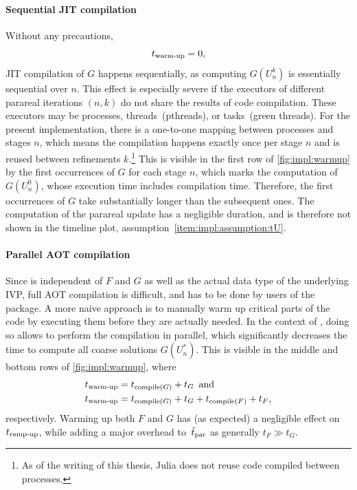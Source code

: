 \paragraph{Sequential \ac{JIT} compilation}

Without any precautions,
\begin{equation*}
  t_\text{warm-up} = 0,
\end{equation*}
\ac{JIT} compilation of $G$ happens sequentially,
as computing $G(U_n^k)$ is essentially sequential over $n$.
This effect is especially severe if the executors of different parareal iterations $(n,k)$ do not share the results of code compilation.
These executors may be processes, threads~(pthreads), or tasks~(green threads).
For the present implementation,
there is a one-to-one mapping between processes and stages $n$,
which means the compilation happens exactly once per stage $n$ and is reused between refinements $k$.\footnote{%
  As of the writing of this thesis, Julia does not reuse code compiled between processes.
}
This is visible in the first row of \autoref{fig:impl:warmup}
by the first occurrences of $G$ for each stage $n$,
which marks the computation of $G(U_n^0)$,
whose execution time includes compilation time.
Therefore, the first occurrences of $G$ take substantially longer than the subsequent ones.
The computation of the parareal update has a negligible duration,
and is therefore not shown in the timeline plot,
\cf assumption~\ref{item:impl:assumption:tU}.

\paragraph{Parallel \acs{AOT} compilation}

Since  is independent of $F$ and $G$ as well as the actual data type of the underlying \ac{IVP},
full \ac{AOT} compilation is difficult, and has to be done by users of the package.
A more naive approach is to manually warm up critical parts of the code by executing them before they are actually needed.
In the context of ,
doing so allows to perform the compilation in parallel,
which significantly decreases the time to compute all coarse solutions $G(U_n^*)$.
This is visible in the middle and bottom rows of \autoref{fig:impl:warmup},
where
\begin{align*}
  t_\text{warm-up} &= t_{\operatorname{compile}(G)} + t_G
  \enspace
  \text{and} \\
  t_\text{warm-up} &= t_{\operatorname{compile}(G)} + t_G + t_{\operatorname{compile}(F)} + t_F,
\end{align*}
respectively.
Warming up both $F$ and $G$ has (as expected) a negligible effect on~$t_\text{ramp-up}$,
while adding a major overhead to~$\hat t_\text{par}$ as generally $t_F \gg t_G$.

